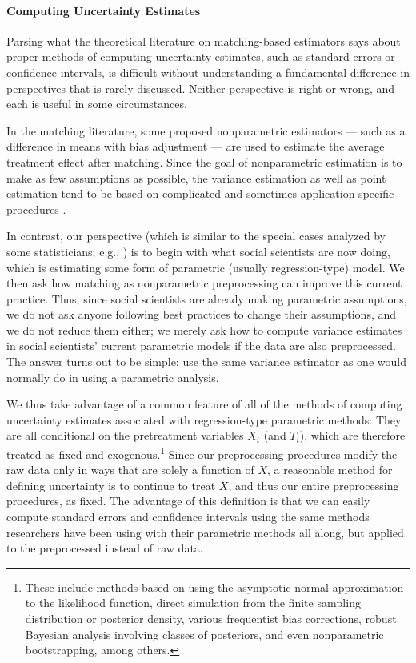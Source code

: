 \documentclass[11pt,titlepage]{article}
\begin{document}
\paragraph{Computing Uncertainty Estimates}

Parsing what the theoretical literature on matching-based estimators
says about proper methods of computing uncertainty estimates, such as
standard errors or confidence intervals, is difficult without
understanding a fundamental difference in perspectives that is rarely
discussed.  Neither perspective is right or wrong, and each is useful
in some circumstances.  

In the matching literature, some proposed nonparametric estimators ---
such as a difference in means with bias adjustment --- are used to
estimate the average treatment effect after matching.  Since the goal
of nonparametric estimation is to make as few assumptions as possible,
the variance estimation as well as point estimation tend to be based
on complicated and sometimes application-specific procedures
\citep[e.g.,][]{AbaImb05}.

In contrast, our perspective (which is similar to the special cases
analyzed by some statisticians; e.g., \citealt{RubTho00}) is to begin
with what social scientists are now doing, which is estimating some
form of parametric (usually regression-type) model.  We then ask how
matching as nonparametric preprocessing can improve this current
practice.  Thus, since social scientists are already making parametric
assumptions, we do not ask anyone following best practices to change
their assumptions, and we do not reduce them either; we merely ask how
to compute variance estimates in social scientists' current parametric
models if the data are also preprocessed.  The answer turns out to be
simple: use the same variance estimator as one would normally do in
using a parametric analysis.

We thus take advantage of a common feature of all of the methods of
computing uncertainty estimates associated with regression-type
parametric methods: They are all conditional on the pretreatment
variables $X_i$ (and $T_i$), which are therefore treated as fixed and
exogenous.\footnote{These include methods based on using the
  asymptotic normal approximation to the likelihood function, direct
  simulation from the finite sampling distribution or posterior
  density, various frequentist bias corrections, robust Bayesian
  analysis involving classes of posteriors, and even nonparametric
  bootstrapping, among others.}  Since our preprocessing procedures
modify the raw data only in ways that are solely a function of $X$, a
reasonable method for defining uncertainty is to continue to treat
$X$, and thus our entire preprocessing procedures, as fixed.  The
advantage of this definition is that we can easily compute standard
errors and confidence intervals using the same methods researchers
have been using with their parametric methods all along, but applied
to the preprocessed instead of raw data.
\end{document}
